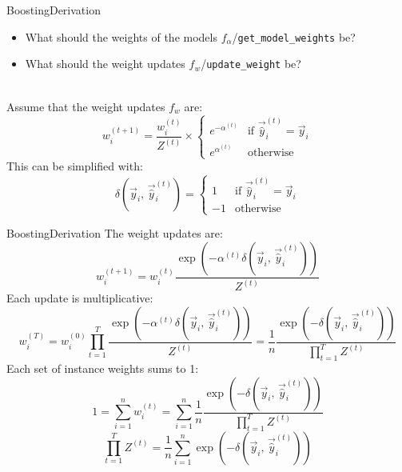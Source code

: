 \documentclass[10pt]{beamer}
\begin{document}
\begin{frame}{Boosting}{Derivation}
  \begin{itemize}
    \item What should the weights of the models
          $f_\alpha$/\lstinline[language=Python]{get_model_weights} be?
    \item What should the weight updates
          $f_w$/\lstinline[language=Python]{update_weight} be?
          \\~\
  \end{itemize}
  Assume that the weight updates $f_w$ are:
  \begin{equation*}
    w^{(t+1)}_i
    =
    \frac{w^{(t)}_i}{Z^{(t)}}
    \times
    \begin{cases}
      e^{-\alpha^{(t)}} & \text{if } \vec{\hat{y}}_i^{(t)} = \vec{y}_i
      \\
      e^{\alpha^{(t)}}  & \text{otherwise}
    \end{cases}
  \end{equation*}
  This can be simplified with:
  \begin{equation*}
    \delta(\vec{y}_i,\,\vec{\hat{y}}_i^{(t)})
    =
    \begin{cases}
      1  & \text{if } \vec{\hat{y}}_i^{(t)} = \vec{y}_i
      \\
      -1 & \text{otherwise}
    \end{cases}
  \end{equation*}
\end{frame}

\begin{frame}{Boosting}{Derivation}
  The weight updates are:
  \begin{equation*}
    w^{(t+1)}_i
    =
    w^{(t)}_i
    \frac{
    \exp(-\alpha^{(t)}\delta(\vec{y}_i,\,\vec{\hat{y}}_i^{(t)}))
    }{
    Z^{(t)}
    }
  \end{equation*}
  Each update is multiplicative:
  \begin{equation*}
    w^{(T)}_i
    =
    w^{(0)}_i
    \prod_{t=1}^{T}
    \frac{
    \exp(-\alpha^{(t)}\delta(\vec{y}_i,\,\vec{\hat{y}}_i^{(t)}))
    }{
    Z^{(t)}
    }
    =
    \frac{1}{n}
    \frac{
    \exp(-\delta(\vec{y}_i,\,\vec{\hat{y}}_i^{(t)}))
    }{
    \prod_{t=1}^{T}Z^{(t)}
    }
  \end{equation*}
  Each set of instance weights sums to 1:
  \begin{equation*}
    1
    =
    \sum_{i = 1}^{n}w^{(t)}_i
    =
    \sum_{i = 1}^{n}
    \frac{1}{n}
    \frac{
    \exp(-\delta(\vec{y}_i,\,\vec{\hat{y}}_i^{(t)}))
    }{
    \prod_{t=1}^{T}Z^{(t)}
    }
  \end{equation*}
  \begin{equation*}
    \prod_{t=1}^{T} Z^{(t)}
    =
    \frac{1}{n}
    \sum_{i = 1}^{n}
    \exp(-\delta(\vec{y}_i,\,\vec{\hat{y}}_i^{(t)}))
  \end{equation*}
\end{frame}
\end{document}

